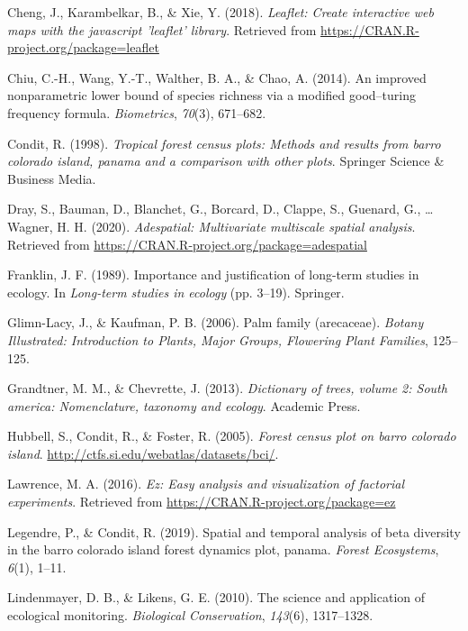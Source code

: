 \documentclass[11pt,]{article}
\begin{document}
\hypertarget{ref-Leaflet}{}
Cheng, J., Karambelkar, B., \& Xie, Y. (2018). \emph{Leaflet: Create
interactive web maps with the javascript 'leaflet' library}. Retrieved
from \url{https://CRAN.R-project.org/package=leaflet}

\hypertarget{ref-chiu2014improved}{}
Chiu, C.-H., Wang, Y.-T., Walther, B. A., \& Chao, A. (2014). An
improved nonparametric lower bound of species richness via a modified
good--turing frequency formula. \emph{Biometrics}, \emph{70}(3),
671--682.

\hypertarget{ref-condit1998tropical}{}
Condit, R. (1998). \emph{Tropical forest census plots: Methods and
results from barro colorado island, panama and a comparison with other
plots}. Springer Science \& Business Media.

\hypertarget{ref-adespatial}{}
Dray, S., Bauman, D., Blanchet, G., Borcard, D., Clappe, S., Guenard,
G., \ldots{} Wagner, H. H. (2020). \emph{Adespatial: Multivariate
multiscale spatial analysis}. Retrieved from
\url{https://CRAN.R-project.org/package=adespatial}

\hypertarget{ref-franklin1989importance}{}
Franklin, J. F. (1989). Importance and justification of long-term
studies in ecology. In \emph{Long-term studies in ecology} (pp. 3--19).
Springer.

\hypertarget{ref-glimn2006palm}{}
Glimn-Lacy, J., \& Kaufman, P. B. (2006). Palm family (arecaceae).
\emph{Botany Illustrated: Introduction to Plants, Major Groups,
Flowering Plant Families}, 125--125.

\hypertarget{ref-grandtner2013dictionary}{}
Grandtner, M. M., \& Chevrette, J. (2013). \emph{Dictionary of trees,
volume 2: South america: Nomenclature, taxonomy and ecology}. Academic
Press.

\hypertarget{ref-Hubbell2005Barro}{}
Hubbell, S., Condit, R., \& Foster, R. (2005). \emph{Forest census plot
on barro colorado island}.
\url{http://ctfs.si.edu/webatlas/datasets/bci/}.

\hypertarget{ref-EZ}{}
Lawrence, M. A. (2016). \emph{Ez: Easy analysis and visualization of
factorial experiments}. Retrieved from
\url{https://CRAN.R-project.org/package=ez}

\hypertarget{ref-legendre2019spatial}{}
Legendre, P., \& Condit, R. (2019). Spatial and temporal analysis of
beta diversity in the barro colorado island forest dynamics plot,
panama. \emph{Forest Ecosystems}, \emph{6}(1), 1--11.

\hypertarget{ref-lindenmayer2010science}{}
Lindenmayer, D. B., \& Likens, G. E. (2010). The science and application
of ecological monitoring. \emph{Biological Conservation}, \emph{143}(6),
1317--1328.
\end{document}
